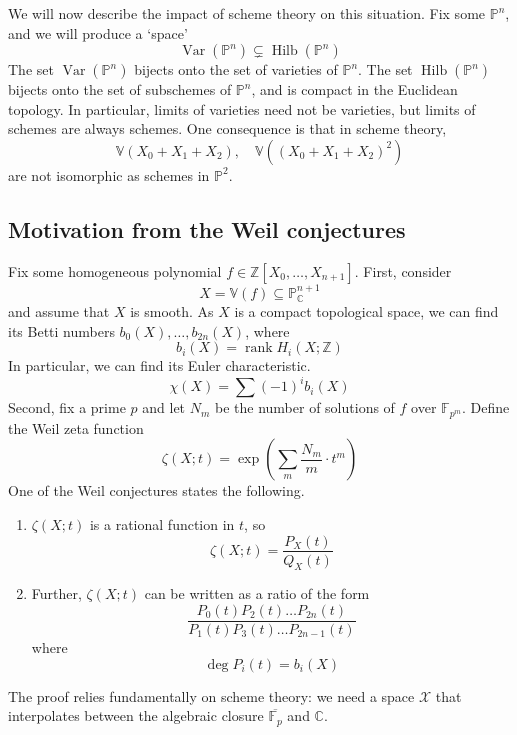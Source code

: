 We will now describe the impact of scheme theory on this situation.
Fix some \( \mathbb P^n \), and we will produce a `space'
\[ \operatorname{Var}(\mathbb P^n) \subsetneq \operatorname{Hilb}(\mathbb P^n) \]
The set \( \operatorname{Var}(\mathbb P^n) \) bijects onto the set of varieties of \( \mathbb P^n \).
The set \( \operatorname{Hilb}(\mathbb P^n) \) bijects onto the set of subschemes of \( \mathbb P^n \), and is compact in the Euclidean topology.
In particular, limits of varieties need not be varieties, but limits of schemes are always schemes.
One consequence is that in scheme theory,
\[ \mathbb V(X_0 + X_1 + X_2),\quad \mathbb V((X_0 + X_1 + X_2)^2) \]
are not isomorphic as schemes in \( \mathbb P^2 \).

\subsection{Motivation from the Weil conjectures}
Fix some homogeneous polynomial \( f \in \mathbb Z[X_0, \dots, X_{n+1}] \).
First, consider
\[ X = \mathbb V(f) \subseteq \mathbb P^{n+1}_{\mathbb C} \]
and assume that \( X \) is smooth.
As \( X \) is a compact topological space, we can find its Betti numbers \( b_0(X), \dots, b_{2n}(X) \), where
\[ b_i(X) = \operatorname{rank} H_i(X; \mathbb Z) \]
In particular, we can find its Euler characteristic.
\[ \chi(X) = \sum (-1)^i b_i(X) \]
Second, fix a prime \( p \) and let \( N_m \) be the number of solutions of \( f \) over \( \mathbb F_{p^m} \).
Define the Weil zeta function
\[ \zeta(X;t) = \exp(\sum_m \frac{N_m}{m} \cdot t^m) \]
One of the Weil conjectures states the following.
\begin{theorem}[Grothendieck]
    \begin{enumerate}
        \item \( \zeta(X; t) \) is a rational function in \( t \), so
        \[ \zeta(X; t) = \frac{P_X(t)}{Q_X(t)} \]
        \item Further, \( \zeta(X; t) \) can be written as a ratio of the form
        \[ \frac{P_0(t) P_2(t) \dots P_{2n}(t)}{P_1(t) P_3(t) \dots P_{2n-1}(t)} \]
        where
        \[ \deg P_i(t) = b_i(X) \]
    \end{enumerate}
\end{theorem}
The proof relies fundamentally on scheme theory: we need a space \( \mathcal X \) that interpolates between the algebraic closure \( \overline{\mathbb F_p} \) and \( \mathbb C \).

